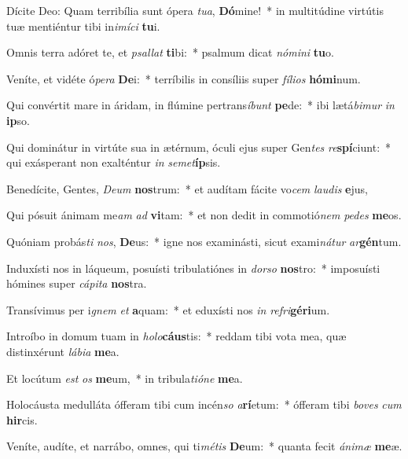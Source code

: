 \item Dícite Deo: Quam terribília sunt ópera \textit{tu}\textit{a}, \textbf{Dó}mine!~* in multitúdine virtútis tuæ mentiéntur tibi in\textit{i}\textit{mí}\textit{ci} \textbf{tu}i.
\item Omnis terra adóret te, et \textit{psal}\textit{lat} \textbf{ti}bi:~* psalmum dicat \textit{nó}\textit{mi}\textit{ni} \textbf{tu}o.
\item Veníte, et vidéte ó\textit{pe}\textit{ra} \textbf{De}i:~* terríbilis in consíliis super \textit{fí}\textit{li}\textit{os} \textbf{hó}\textbf{mi}num.
\item Qui convértit mare in áridam, in flúmine pertrans\textit{í}\textit{bunt} \textbf{pe}de:~* ibi lætá\textit{bi}\textit{mur} \textit{in} \textbf{ip}so.
\item Qui dominátur in virtúte sua in ætérnum, óculi ejus super Gen\textit{tes} \textit{re}\textbf{spí}ciunt:~* qui exásperant non exalténtur \textit{in} \textit{se}\textit{met}\textbf{íp}sis.
\item Benedícite, Gentes, \textit{De}\textit{um} \textbf{nos}trum:~* et audítam fácite vo\textit{cem} \textit{lau}\textit{dis} \textbf{e}jus,
\item Qui pósuit ánimam me\textit{am} \textit{ad} \textbf{vi}tam:~* et non dedit in commotió\textit{nem} \textit{pe}\textit{des} \textbf{me}os.
\item Quóniam probás\textit{ti} \textit{nos}, \textbf{De}us:~* igne nos examinásti, sicut exami\textit{ná}\textit{tur} \textit{ar}\textbf{gén}tum.
\item Induxísti nos in láqueum, posuísti tribulatiónes in \textit{dor}\textit{so} \textbf{nos}tro:~* imposuísti hómines super \textit{cá}\textit{pi}\textit{ta} \textbf{nos}tra.
\item Transívimus per i\textit{gnem} \textit{et} \textbf{a}quam:~* et eduxísti nos \textit{in} \textit{re}\textit{fri}\textbf{gé}\textbf{ri}um.
\item Introíbo in domum tuam in \textit{ho}\textit{lo}\textbf{cáus}tis:~* reddam tibi vota mea, quæ distinxérunt \textit{lá}\textit{bi}\textit{a} \textbf{me}a.
\item Et locútum \textit{est} \textit{os} \textbf{me}um,~* in tribula\textit{ti}\textit{ó}\textit{ne} \textbf{me}a.
\item Holocáusta medulláta ófferam tibi cum incén\textit{so} \textit{a}\textbf{rí}etum:~* ófferam tibi \textit{bo}\textit{ves} \textit{cum} \textbf{hir}cis.
\item Veníte, audíte, et narrábo, omnes, qui ti\textit{mé}\textit{tis} \textbf{De}um:~* quanta fecit \textit{á}\textit{ni}\textit{mæ} \textbf{me}æ.
